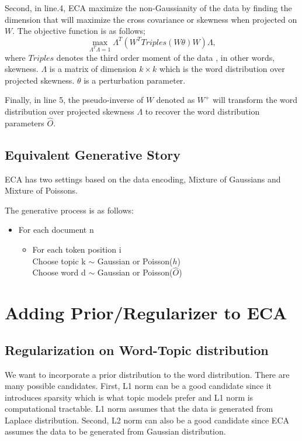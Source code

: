 \documentclass{article}
\begin{document}
Second, in line.4, ECA maximize the non-Gaussianity of the data by finding the dimension that will maximize the cross covariance or skewness when projected on $W$. The objective function is as follows;
\begin{equation}
\max_{\Lambda^T\Lambda = 1} \Lambda^T (W^T Triples (W\theta)W) \Lambda,
\end{equation}
where $Triples$ denotes the third order moment of the data , in other words, skewness. $\Lambda$ is a matrix of dimension $k \times k$ which is the word distribution over projected skewness. $\theta$ is a perturbation parameter.

Finally, in line 5, the pseudo-inverse of $W$ denoted as $W^+$ will transform the word distribution over projected skewness $\Lambda$ to recover the word distribution parameters $\hat{O}$.

\subsection{Equivalent Generative Story}
ECA has two settings based on the data encoding, Mixture of Gaussians and Mixture of Poissons.

The generative process is as follows:
\begin{itemize}
\item
For each document n
\begin{itemize}
\item
For each token position i \\
Choose topic k $\sim$ Gaussian or Poisson($h$) \\
Choose word d  $\sim$ Gaussian or Poisson($\hat{O}$) \\
\end{itemize}
\end{itemize}





\section{Adding Prior/Regularizer to ECA}
\subsection{Regularization on Word-Topic distribution}
We want to incorporate a prior distribution to the word distribution. There are many possible candidates. First, L1 norm can be a good candidate since it introduces sparsity which is what topic models prefer and L1 norm is computational tractable. L1 norm assumes that the data is generated from Laplace distribution. Second, L2 norm can also be a good candidate since ECA assumes the data to be generated from Gaussian distribution. 
\end{document}
